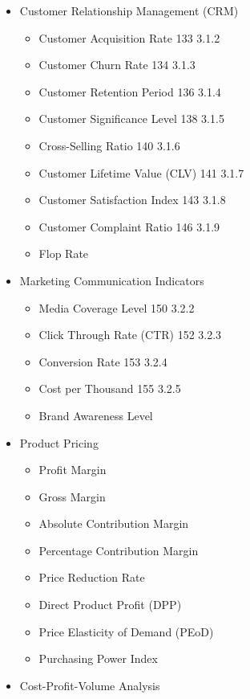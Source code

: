 \documentclass[]{book}
\providecommand{\tightlist}{%
  \setlength{\itemsep}{0pt}\setlength{\parskip}{0pt}}
\begin{document}
\begin{itemize}
\tightlist
\item
  Customer Relationship Management (CRM)

  \begin{itemize}
  \tightlist
  \item
    Customer Acquisition Rate 133 3.1.2
  \item
    Customer Churn Rate 134 3.1.3
  \item
    Customer Retention Period 136 3.1.4
  \item
    Customer Significance Level 138 3.1.5
  \item
    Cross-Selling Ratio 140 3.1.6
  \item
    Customer Lifetime Value (CLV) 141 3.1.7
  \item
    Customer Satisfaction Index 143 3.1.8
  \item
    Customer Complaint Ratio 146 3.1.9
  \item
    Flop Rate
  \end{itemize}
\item
  Marketing Communication Indicators

  \begin{itemize}
  \tightlist
  \item
    Media Coverage Level 150 3.2.2
  \item
    Click Through Rate (CTR) 152 3.2.3
  \item
    Conversion Rate 153 3.2.4
  \item
    Cost per Thousand 155 3.2.5
  \item
    Brand Awareness Level
  \end{itemize}
\item
  Product Pricing

  \begin{itemize}
  \tightlist
  \item
    Profit Margin
  \item
    Gross Margin
  \item
    Absolute Contribution Margin\\
  \item
    Percentage Contribution Margin\\
  \item
    Price Reduction Rate\\
  \item
    Direct Product Profit (DPP)\\
  \item
    Price Elasticity of Demand (PEoD)\\
  \item
    Purchasing Power Index
  \end{itemize}
\item
  Cost-Profit-Volume Analysis


\end{itemize}
\end{document}
